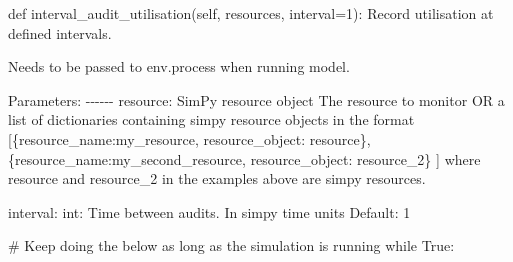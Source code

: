 \documentclass[
  letterpaper,
  DIV=11,
  numbers=noendperiod]{scrreprt}
\newenvironment{Shaded}{}{}
\newcommand{\CommentTok}[1]{\textcolor[rgb]{0.42,0.45,0.49}{#1}}
\newcommand{\ControlFlowTok}[1]{\textcolor[rgb]{0.84,0.23,0.29}{#1}}
\newcommand{\DecValTok}[1]{\textcolor[rgb]{0.00,0.36,0.77}{#1}}
\newcommand{\KeywordTok}[1]{\textcolor[rgb]{0.84,0.23,0.29}{#1}}
\newcommand{\NormalTok}[1]{\textcolor[rgb]{0.14,0.16,0.18}{#1}}
\newcommand{\OperatorTok}[1]{\textcolor[rgb]{0.14,0.16,0.18}{#1}}
\newcommand{\VariableTok}[1]{\textcolor[rgb]{0.89,0.38,0.04}{#1}}
\begin{document}
\begin{tcolorbox}
\begin{Shaded}
\begin{Highlighting}[]
    \KeywordTok{def}\NormalTok{ interval\_audit\_utilisation(}\VariableTok{self}\NormalTok{, resources, interval}\OperatorTok{=}\DecValTok{1}\NormalTok{):}
        \CommentTok{\textquotesingle{}\textquotesingle{}\textquotesingle{}}
\CommentTok{        Record utilisation at defined intervals.}

\CommentTok{        Needs to be passed to env.process when running model.}

\CommentTok{        Parameters:}
\CommentTok{        {-}{-}{-}{-}{-}{-}}
\CommentTok{        resource: SimPy resource object}
\CommentTok{            The resource to monitor}
\CommentTok{            OR}
\CommentTok{            a list of dictionaries containing simpy resource objects in the format}
\CommentTok{            [\{\textquotesingle{}resource\_name\textquotesingle{}:\textquotesingle{}my\_resource\textquotesingle{}, \textquotesingle{}resource\_object\textquotesingle{}: resource\},}
\CommentTok{            \{\textquotesingle{}resource\_name\textquotesingle{}:\textquotesingle{}my\_second\_resource\textquotesingle{}, \textquotesingle{}resource\_object\textquotesingle{}: resource\_2\}}
\CommentTok{            ]}
\CommentTok{            where resource and resource\_2 in the examples above are simpy resources.}

\CommentTok{        interval: int:}
\CommentTok{            Time between audits.}
\CommentTok{            In simpy time units}
\CommentTok{            Default: 1}
\CommentTok{        \textquotesingle{}\textquotesingle{}\textquotesingle{}}

        \CommentTok{\# Keep doing the below as long as the simulation is running}
        \ControlFlowTok{while} \VariableTok{True}\NormalTok{:}


\end{Highlighting}
\end{Shaded}
\end{tcolorbox}
\end{document}
